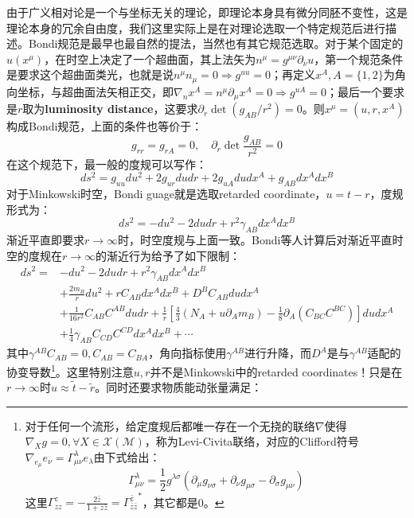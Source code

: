 由于广义相对论是一个与坐标无关的理论，即理论本身具有微分同胚不变性，这是理论本身的冗余自由度，我们这里实际上是在对理论选取一个特定规范后进行描述。Bondi规范是最早也最自然的提法，当然也有其它规范选取\cite{Campiglia:2015kxa,Campiglia:2015lxa}。对于某个固定的$u(x^\mu)$，在时空上决定了一个超曲面，其上法矢为$n^\mu=g^{\mu\nu}\partial_\nu u$，第一个规范条件是要求这个超曲面类光，也就是说$n^\mu n_\mu=0\Rightarrow g^{uu}=0$；再定义$x^A,A=\{1,2\}$为角向坐标，与超曲面法矢相正交，即$\nabla_n x^A=n^\mu\partial_\mu x^A=0\Rightarrow g^{uA}=0$；最后一个要求是$r$取为\textbf{luminosity distance}，这要求$\partial_r \det (g_{AB}/r^2)=0$。则$x^\mu=(u,r,x^A)$构成Bondi规范，上面的条件也等价于：
\begin{equation}
	g_{rr}=g_{rA}=0,\quad \partial_r\det\frac{g_{AB}}{r^2}=0
\end{equation}
在这个规范下，最一般的度规可以写作：
\begin{equation}
	ds^2=g_{uu}du^2+2g_{ur}dudr+2g_{uA}dudx^A+g_{AB}dx^Adx^B
\end{equation}
对于Minkowski时空，Bondi guage就是选取retarded coordinate，$u=t-r$，度规形式为：
\begin{equation}
	ds^2=-du^2-2dudr+r^2\gamma_{AB}dx^Adx^B
\end{equation}
渐近平直即要求$r\to\infty$时，时空度规与上面一致。Bondi等人计算后对渐近平直时空的度规在$r\to\infty$的渐近行为给予了如下限制\cite{Bondi:1962px,Sachs:1962wk}：
\begin{equation}\label{eq:17.4}
	\begin{aligned}
		ds^2=&-du^2-2dudr+r^2\gamma_{AB}dx^Adx^B\\
		&+\frac{2m_B}{r}du^2+rC_{AB}dx^Adx^B+D^B C_{AB}dudx^A\\
		&+\frac{1}{16r^2}C_{AB}C^{AB}dudr+\frac{1}{r}\left[\frac{4}{3}\left(N_A+u\partial_Am_B\right)-\frac{1}{8}\partial_A\left(C_{BC}C^{BC}\right)\right]dudx^A\\
		&+\frac{1}{4}\gamma_{AB}C_{CD}C^{CD}dx^Adx^B+\cdots
	\end{aligned}
\end{equation}
其中$\gamma^{AB}C_{AB}=0,C_{AB}=C_{BA}$，角向指标使用$\gamma^{AB}$进行升降，而$D^A$是与$\gamma^{AB}$适配的协变导数\footnote{对于任何一个流形，给定度规后都唯一存在一个无挠的联络$\nabla$使得$\nabla_X g=0,\forall X\in\mathscr{X}(\mathcal{M})$，称为Levi-Civita联络，对应的Clifford符号$\nabla_{e_\mu}e_\nu=\Gamma_{\mu\nu}^{\lambda}e_\lambda$由下式给出：
\[\Gamma^\lambda_{\mu\nu}=\frac{1}{2}g^{\lambda\sigma}\left(\partial_\mu g_{\nu\sigma}+\partial_\nu g_{\mu\sigma}-\partial_\sigma g_{\mu\nu}\right)\]这里$\Gamma^{z}_{zz}=-\frac{2\bar z}{1+z\bar z}={\Gamma^{\bar z}_{\bar z\bar z}}^*$，其它都是0。}。这里特别注意$u,r$并不是Minkowski中的retarded coordinates！只是在$r\to\infty$时$u\approx \tilde t-\tilde r$。同时还要求物质能动张量满足：
